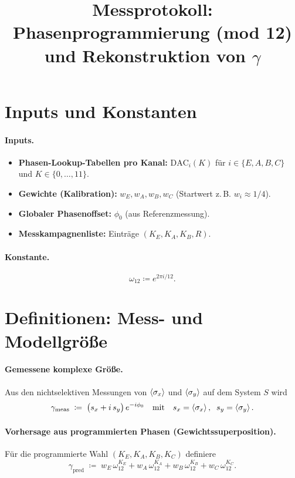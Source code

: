 \documentclass[11pt,a4paper]{article}
\title{\textbf{Messprotokoll: Phasenprogrammierung (mod 12) und Rekonstruktion von $\gamma$}}
\author{}
\date{}
\newcommand{\omegaT}{\omega_{12}}
\begin{document}
	\maketitle
	
	\section{Inputs und Konstanten}
	
	\paragraph{Inputs.}
	\begin{itemize}
		\item \textbf{Phasen-Lookup-Tabellen pro Kanal:} $\mathrm{DAC}_i(K)$ für $i\in\{E,A,B,C\}$ und $K\in\{0,\dots,11\}$.
		\item \textbf{Gewichte (Kalibration):} $w_E,w_A,w_B,w_C$ (Startwert z.\,B. $w_i\approx 1/4$).
		\item \textbf{Globaler Phasenoffset:} $\phi_0$ (aus Referenzmessung).
		\item \textbf{Messkampagnenliste:} Einträge $(K_E,K_A,K_B,R)$.
	\end{itemize}
	
	\paragraph{Konstante.}
	\[
	\omegaT \coloneqq e^{2\pi i/12}.
	\]
	
	\section{Definitionen: Mess- und Modellgröße}
	
	\paragraph{Gemessene komplexe Größe.}
	Aus den nichtselektiven Messungen von $\expval{\sigma_x}$ und $\expval{\sigma_y}$ auf dem System $S$ wird
	\[
	\gamma_{\mathrm{meas}}
	\;\coloneqq\;
	\bigl(s_x + i\,s_y\bigr)\,e^{-i\phi_0}
	\quad\text{mit}\quad
	s_x=\expval{\sigma_x},\;\; s_y=\expval{\sigma_y}.
	\]
	
	\paragraph{Vorhersage aus programmierten Phasen (Gewichtssuperposition).}
	Für die programmierte Wahl $(K_E,K_A,K_B,K_C)$ definiere
	\[
	\gamma_{\mathrm{pred}}
	\;\coloneqq\;
	w_E\,\omegaT^{K_E}
	+
	w_A\,\omegaT^{K_A}
	+
	w_B\,\omegaT^{K_B}
	+
	w_C\,\omegaT^{K_C}.
	\]
	
\end{document}
